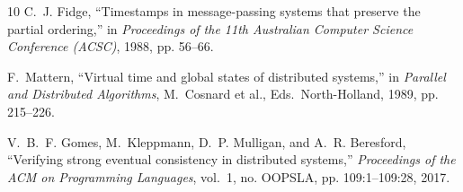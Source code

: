 \documentclass[journal,compsoc,10pt]{IEEEtran}
\theoremstyle{definition}
\theoremstyle{remark}
\begin{document}
\begin{thebibliography}{10}
C.~J. Fidge, ``Timestamps in message-passing systems that preserve the
  partial ordering,'' in \emph{Proceedings of the 11th Australian Computer
  Science Conference (ACSC)}, 1988, pp. 56--66.

F.~Mattern, ``Virtual time and global states of distributed systems,'' in
  \emph{Parallel and Distributed Algorithms}, M.~Cosnard et al., Eds.\
  North-Holland, 1989, pp. 215--226.

V.~B.~F. Gomes, M.~Kleppmann, D.~P. Mulligan, and A.~R. Beresford,
  ``Verifying strong eventual consistency in distributed systems,''
  \emph{Proceedings of the ACM on Programming Languages}, vol.~1, no.
  OOPSLA, pp. 109:1--109:28, 2017.

\end{thebibliography}
\end{document}
